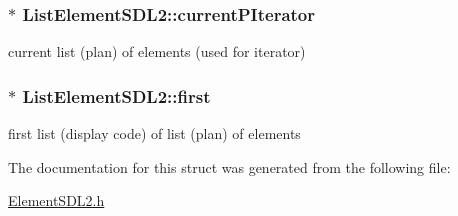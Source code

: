 \subsubsection[{\texorpdfstring{current\+P\+Iterator}{currentPIterator}}]{$\ast$ List\+Element\+S\+D\+L2\+::current\+P\+Iterator}\hypertarget{structListElementSDL2_a3bb9a3656cbff63c06e54554f93b2f87}{}\label{structListElementSDL2_a3bb9a3656cbff63c06e54554f93b2f87}
current list (plan) of elements (used for iterator) 
\subsubsection[{\texorpdfstring{first}{first}}]{$\ast$ List\+Element\+S\+D\+L2\+::first}\hypertarget{structListElementSDL2_a7f871d1b4f017fc8c778c49a3583eecb}{}\label{structListElementSDL2_a7f871d1b4f017fc8c778c49a3583eecb}
first list (display code) of list (plan) of elements 

The documentation for this struct was generated from the following file\+:\begin{DoxyCompactItemize}
\item 
\hyperlink{ElementSDL2_8h}{Element\+S\+D\+L2.\+h}\end{DoxyCompactItemize}
